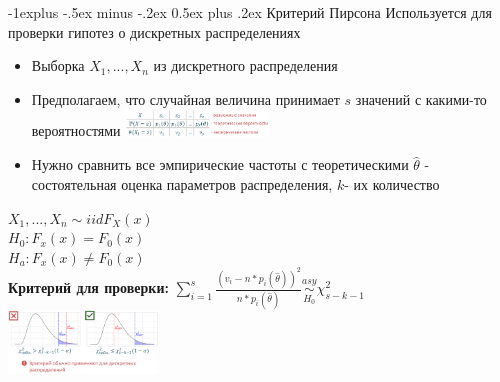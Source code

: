 \documentclass[10pt,landscape]{article}
\makeatletter
\renewcommand{\subsection}{\@startsection{subsection}{2}{0mm}%
                                {-1explus -.5ex minus -.2ex}%
                                {0.5ex plus .2ex}%
                                {\normalfont\normalsize\bfseries}}
\makeatother
\begin{document}
\begin{multicols}{3}
\subsection{Критерий Пирсона}
Используется для проверки гипотез о дискретных распределениях
\begin{itemize}
    \item Выборка $X_1, ..., X_n$ из дискретного распределения
    \item Предполагаем, что случайная величина принимает $s$
значений с какими-то вероятностями
\includegraphics[width=0.3\textwidth]{Screenshot from 2021-09-10 11-53-16.png}
    \item Нужно сравнить все эмпирические частоты
с теоретическими
    $\hat{\theta}$ - состоятельная
оценка параметров
распределения, $k$- их количество
\end{itemize}
$X_1, ... , X_n \sim iid F_X(x)$\\ 
$H_0: F_x(x) = F_0(x)$\\
$H_a: F_x(x) \neq F_0(x)$\\
\textbf{Критерий для проверки:} $\sum\limits_{i=1}^s \frac{(v_i - n * p_i(\hat{\theta}))^2}{n*p_i(\hat{\theta})} \underset{H_0}{\overset{asy}{\sim}} \chi_{s-k-1}^2$
\includegraphics[width=0.3\textwidth]{Screenshot from 2021-09-10 12-03-20.png}


\end{multicols}
\end{document}
